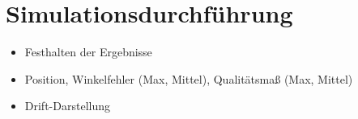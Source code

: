 \section{Simulationsdurchführung}\label{sec:simulationsdurchfuehrung}
	\begin{itemize}
		\item Festhalten der Ergebnisse
		\item Position, Winkelfehler (Max, Mittel), Qualitätsmaß (Max, Mittel)
		\item Drift-Darstellung
	\end{itemize}
	
